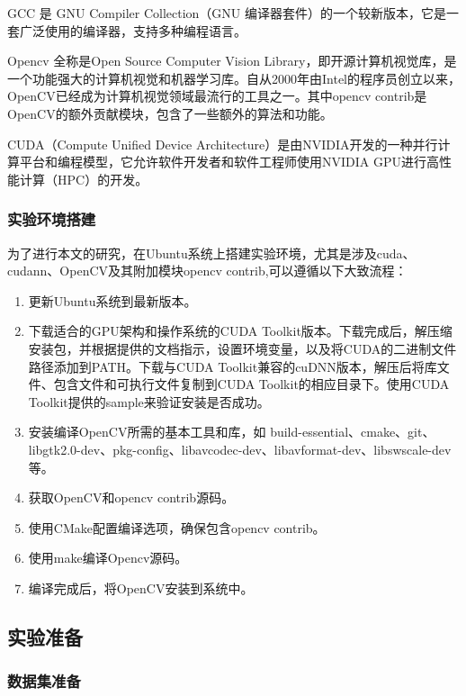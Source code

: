 GCC 是 GNU Compiler Collection（GNU 编译器套件）的一个较新版本，它是一套广泛使用的编译器，支持多种编程语言。

Opencv 全称是Open Source Computer Vision Library，即开源计算机视觉库，是一个功能强大的计算机视觉和机器学习库。自从2000年由Intel的程序员创立以来，OpenCV已经成为计算机视觉领域最流行的工具之一。其中opencv contrib是OpenCV的额外贡献模块，包含了一些额外的算法和功能。

CUDA（Compute Unified Device Architecture）是由NVIDIA开发的一种并行计算平台和编程模型，它允许软件开发者和软件工程师使用NVIDIA GPU进行高性能计算（HPC）的开发。

\subsubsection{实验环境搭建}

为了进行本文的研究，在Ubuntu系统上搭建实验环境，尤其是涉及cuda、cudann、OpenCV及其附加模块opencv contrib,可以遵循以下大致流程：

\begin{enumerate}
\item 更新Ubuntu系统到最新版本。
\item 下载适合的GPU架构和操作系统的CUDA Toolkit版本。下载完成后，解压缩安装包，并根据提供的文档指示，设置环境变量，以及将CUDA的二进制文件路径添加到PATH。下载与CUDA Toolkit兼容的cuDNN版本，解压后将库文件、包含文件和可执行文件复制到CUDA Toolkit的相应目录下。使用CUDA Toolkit提供的sample来验证安装是否成功。
\item 安装编译OpenCV所需的基本工具和库，如 build-essential、cmake、git、libgtk2.0-dev、pkg-config、libavcodec-dev、libavformat-dev、libswscale-dev 等。
\item 获取OpenCV和opencv contrib源码。
\item 使用CMake配置编译选项，确保包含opencv contrib。
\item 使用make编译Opencv源码。
\item 编译完成后，将OpenCV安装到系统中。
\end{enumerate}

\subsection{实验准备}
\subsubsection{数据集准备}

